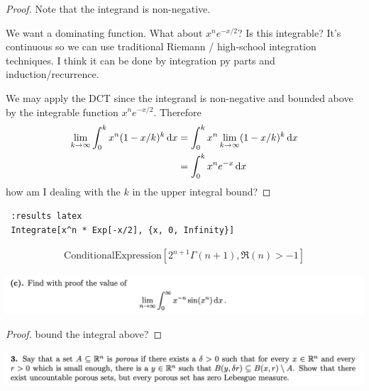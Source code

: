 \begin{proof}
  Note that the integrand is non-negative.

  We want a dominating function. What about $x^ne^{-x/2}$? Is this integrable? It's continuous so we can use
  traditional Riemann / high-school integration techniques. I think it can be done by integration py parts and
  induction/recurrence.

  We may apply the DCT since the integrand is non-negative and bounded above by the integrable
  function $x^ne^{-x/2}$. Therefore
  \begin{align*}
    \lim_{k \to \infty} \int_0^k x^n (1 - x/k)^k \dx
    &= \int_0^k x^n \lim_{k \to \infty} (1 - x/k)^k \dx \\
    &= \int_0^k x^n e^{-x} \dx \\
  \end{align*}
   how am I dealing with the $k$ in the upper integral bound?
\end{proof}

\begin{verbatim} :results latex
 Integrate[x^n * Exp[-x/2], {x, 0, Infinity}]
\end{verbatim}

\begin{align*}
\text{ConditionalExpression}\left[2^{n+1} \Gamma (n+1),\Re(n)>-1\right]
\end{align*}



\begin{mdframed}
\includegraphics[width=400pt]{img/analysis--berkeley-202a-final-c137.png}
\end{mdframed}

\begin{proof}
  bound the integral above?
\end{proof}


\newpage
\begin{mdframed}
\includegraphics[width=400pt]{img/analysis--berkeley-202a-final-ef68.png}
\end{mdframed}


